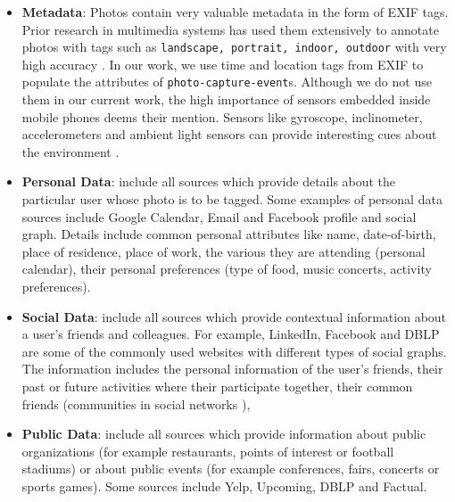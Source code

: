 \begin{itemize}
\item \textbf{Metadata}: Photos contain very valuable metadata in the form of EXIF tags. Prior research in multimedia systems has used them extensively to annotate photos with tags such as \texttt{landscape, portrait, indoor, outdoor} with very high accuracy \cite{boutell2004photo, sinha2008concept}. In our work, we use time and location tags from EXIF to populate the attributes of \texttt{photo-capture-event}s. Although we do not use them in our current work, the high importance of sensors embedded inside mobile phones deems their mention. Sensors like gyroscope, inclinometer, accelerometers and ambient light sensors can provide interesting cues about the environment \cite{patterson2005assisted, siewiorek2003sensay}.

\item \textbf{Personal Data}: include all sources which provide details about the particular user whose photo is to be tagged. Some examples of personal data sources include Google Calendar, Email and Facebook profile and social graph. Details include common personal attributes like name, date-of-birth, place of residence, place of work, the various they are attending (personal calendar), their personal preferences (type of food, music concerts, activity preferences).

\item \textbf{Social Data}: include all sources which provide contextual information about a user's friends and colleagues. For example, LinkedIn, Facebook and DBLP are some of the commonly used websites with different types of social graphs. The information includes the personal information of the user's friends, their past or future activities where their participate together, their common friends (communities in social networks \cite{backstrom2006group, krawczyk2009communities}), 

\item \textbf{Public Data}: include all sources which provide information about public organizations (for example restaurants, points of interest or football stadiums) or about public events (for example conferences, fairs, concerts or sports games). Some sources include Yelp, Upcoming, DBLP and Factual.
\end{itemize}

